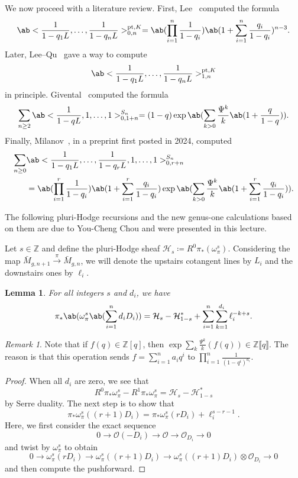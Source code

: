 \documentclass{amsart}
\newtheorem{lem}[thm]{Lemma}
\theoremstyle{definition}
\theoremstyle{remark}
\newtheorem{rmk}[thm]{Remark}
\theoremstyle{plain}
\theoremstyle{definition}
\theoremstyle{remark}
\newcommand{\Z}{\mathbb{Z}}
\newcommand{\mc}[1]{\mathcal{#1}}
\newcommand{\mr}[1]{\mathrm{#1}}
\newcommand{\1}{\mathbf{1}}
\newcommand{\2}{\mathbf{2}}
\newcommand{\3}{\mathbf{3}}
\newcommand{\ps}[1]{\llbracket #1 \rrbracket}
\begin{document}
We now proceed with a literature review. First, Lee~\cite{Lee1997} computed the formula
\[ \ab<\frac{1}{1-q_1 L}, \ldots, \frac{1}{1-q_n L}>_{0,n}^{\mr{pt}, K} = \ab(\prod_{i=1}^n \frac{1}{1-q_i}) \ab(1 + \sum_{i=1}^n \frac{q_i}{1-q_i})^{n-3}. \]
Later, Lee--Qu~\cite{LeeQu2014} gave a way to compute
\[ \ab<\frac{1}{1-q_1 L}, \ldots, \frac{1}{1-q_n L}>_{1,n}^{\mr{pt}, K} \]
in principle. Givental~\cite{Givental2017K1} computed the formula
\[ \sum_{n \geq 2} \ab<\frac{1}{1-q L}, 1, \ldots, 1>_{0,1+n}^{S_n} = (1-q) \exp\ab(\sum_{k > 0} \frac{\Psi^k}{k} \ab(1 + \frac{q}{1-q})). \]
Finally, Milanov~\cite{Milanov2025}, in a preprint first posted in 2024, computed 
\begin{align*}
    \sum_{n \geq 0}& \ab<\frac{1}{1-q_1 L}, \ldots, \frac{1}{1-q_r L}, 1, \ldots, 1>_{0,r+n}^{S_n} \\
    &= \ab(\prod_{i=1}^{r} \frac{1}{1-q_i})\ab(1 + \sum_{i=1}^r \frac{q_i}{1-q_i}) \exp\ab(\sum_{k > 0} \frac{\Psi^k}{k} \ab(1 + \sum_{i=1}^r \frac{q_i}{1-q_i})). 
\end{align*}

The following pluri-Hodge recursions and the new genus-one calculations based on them are due to You-Cheng Chou and were presented in this lecture.

Let \(s \in \Z\) and define the pluri-Hodge sheaf \(\mc{H}_s \coloneqq R^0 \pi_* (\omega_{\pi}^s)\). Considering the map \(\bar{M}_{g,n+1} \xrightarrow{\pi} \bar{M}_{g,n}\), we will denote the upstairs cotangent lines by \(L_i\) and the downstairs ones by \(\ell_i\).

\begin{lem}
    For all integers \(s\) and \(d_i\), we have
    \[ \pi_*\ab(\omega_{\pi}^s\ab(\sum_{i=1}^n d_i D_i)) = \mc{H}_s-\mc{H}_{1-s}^* + \sum_{i=1}^n \sum_{k=1}^{d_i} \ell_i^{-k+s}. \]
\end{lem}

\begin{rmk}
    Note that if \(f(q) \in \Z[q]\), then \(\exp \sum_k \frac{\Psi^k}{k} (f(q)) \in \Z \ps{q}\). The reason is that this operation sends \(f = \sum_{i=1}^{n} a_i q^i\) to \(\prod_{i=1}^n \frac{1}{(1-q^i)^{a_i}}\).
\end{rmk}

\begin{proof}
    When all \(d_i\) are zero, we see that
    \[ R^0 \pi_* \omega_{\pi}^s - R^1 \pi_* \omega_{\pi}^s = \mc{H}_s - \mc{H}_{1-s}^* \]
    by Serre duality. The next step is to show that
    \[ \pi_* \omega_{\pi}^s ((r+1)D_i) = \pi_* \omega_{\pi}^s(r D_i) + \ell_i^{s-r-1}. \]
    Here, we first consider the exact sequence
    \[ 0 \to \mc{O} (-D_i) \to \mc{O} \to \mc{O}_{D_i} \to 0 \]
    and twist by \(\omega_{\pi}^s\) to obtain
    \[ 0 \to \omega_{\pi}^s(r D_i) \to \omega_{\pi}^s ((r+1)D_i) \to \omega_{\pi}^s ((r+1)D_i) \otimes \mc{O}_{D_i} \to 0 \]
    and then compute the pushforward.
\end{proof}
\end{document}

